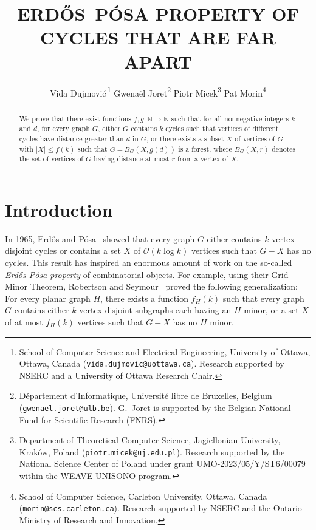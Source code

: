 \documentclass{patmorin}
\title{\MakeUppercase{{E}rdős–{P}ósa property of cycles that are far apart}}
\author{
 Vida Dujmovi{\'c}\,\footnote{School of Computer Science and Electrical Engineering, University of Ottawa, Ottawa, Canada (\texttt{vida.dujmovic@uottawa.ca}). Research supported by NSERC and a University of Ottawa Research Chair.}
 \qquad
 Gwena\"el Joret\footnote{D\'epartement d'Informatique, Universit\'e libre de Bruxelles, Belgium ({\tt gwenael.joret@ulb.be}). G.\ Joret is supported by the Belgian National Fund for Scientific Research (FNRS).}
 \qquad
 Piotr Micek\footnote{Department of Theoretical Computer Science, Jagiellonian University, Kraków, Poland (\texttt{piotr.micek@uj.edu.pl}). Research supported by the National Science Center of Poland under grant
UMO-2023/05/Y/ST6/00079 within the WEAVE-UNISONO program.}
 \qquad
 Pat Morin\footnote{School of Computer Science, Carleton University, Ottawa, Canada (\texttt{morin@scs.carleton.ca}). Research supported by NSERC and the Ontario Ministry of Research and Innovation.}}
\date{}
\newcommand{\pat}[1]{\textcolor{Blue}{[Pat: #1]}}
\newcommand{\Oh}{\mathcal{O}}
\begin{document}
\maketitle



\begin{abstract}
  We prove that there exist functions  $f,g:\mathbb{N}\to\mathbb{N}$ such that for all nonnegative integers $k$ and $d$,  for every graph $G$,  either $G$ contains $k$ cycles such that vertices of different cycles have distance greater than $d$ in $G$, or there exists a subset $X$ of vertices of $G$ with $|X|\leq f(k)$ such that  $G-B_G(X,g(d))$ is a forest, where $B_G(X,r)$ denotes the set of vertices of $G$ having distance at most $r$ from a vertex of $X$.
\end{abstract}



\section{Introduction}

In 1965, Erdős and Pósa~\cite{EP1965} showed that every graph $G$ 
either contains $k$ vertex-disjoint cycles 
or contains a set $X$ of $\Oh(k\log k)$ vertices such that $G-X$ has no cycles. 
This result has inspired an enormous amount of work on the so-called \emph{Erdős-Pósa property} of combinatorial objects. 
For example, using their Grid Minor Theorem, Robertson and Seymour~\cite{RS1986} proved the following generalization: For every planar graph $H$, there exists a function $f_H(k)$ such that every graph $G$ contains either $k$ vertex-disjoint subgraphs each having an $H$ minor, or a set $X$ of at most $f_H(k)$ vertices such that $G-X$ has no $H$ minor. 
\end{document}
